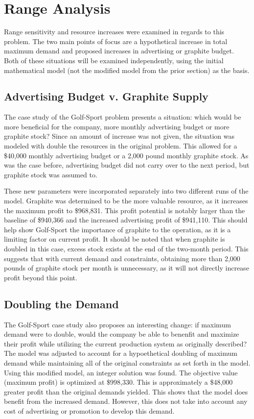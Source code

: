 \documentclass{article}
\begin{document}
\section{Range Analysis}
Range sensitivity and resource increases were examined in regards to this problem.  The two main points of focus are a hypothetical increase in total maximum demand and proposed increases in advertising or graphite budget.  Both of these situations 
will be examined independently, using the initial mathematical model (not the modified model from the prior section) as the basis.
\subsection{Advertising Budget v. Graphite Supply}
The case study of the Golf-Sport problem presents a situation:  which would be more beneficial for the company, more monthly advertising budget or more graphite stock?  Since an amount of increase was not given, the situation was modeled with double the resources in the original problem.  
This allowed for a \$40,000 monthly advertising budget or a 2,000 pound monthly graphite stock.  As was the case before, advertising budget did not carry over to the next period, but graphite stock was assumed to.
\par
These new parameters were incorporated separately into two different runs of the model.  Graphite was determined to be the more valuable resource, as it increases the maximum profit to \$968,831.  This profit potential is notably larger than the baseline of \$940,366 and the increased advertising 
profit of \$941,110.  This should help show Golf-Sport the importance of graphite to the operation, as it is a limiting factor on current profit.  It should be noted that when graphite is doubled in this case, excess stock exists at the end of the two-month period.  This suggests that with current demand and constraints, obtaining more than 2,000 pounds of graphite stock per month is unnecessary, 
as it will not directly increase profit beyond this point.
\subsection{Doubling the Demand}
The Golf-Sport case study also proposes an interesting change:  if maximum demand were to double, would the company be able to benenfit and maximize their profit while utilizing the current production system as originally described?  The model was adjusted to account for a hypoethetical doubling of maximum demand while maintaining all of the original constraints as set forth in the model.  
Using this modified model, an integer solution was found.  The objective value (maximum profit) is optimized at \$998,330.  This is approximately a \$48,000 greater profit than the original demands yielded.  This shows that the model does benefit from the increased demand.  However, this does not take into account any cost of advertising or promotion to develop this demand.
\end{document}
